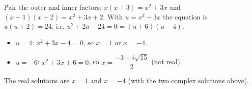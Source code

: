 Pair the outer and inner factors: $x(x+3)=x^2+3x$ and $(x+1)(x+2)=x^2+3x+2$. With $u=x^2+3x$ the equation is $u(u+2)=24$, i.e. $u^2+2u-24=0=(u+6)(u-4)$.
\begin{itemize}
\item $u=4$: $x^2+3x-4=0$, so $x=1$ or $x=-4$.
\item $u=-6$: $x^2+3x+6=0$, so $x=\dfrac{-3\pm i\sqrt{15}}{2}$ (not real).
\end{itemize}
The real solutions are $\boxed{x=1\text{ and }x=-4}$ (with the two complex solutions above).
